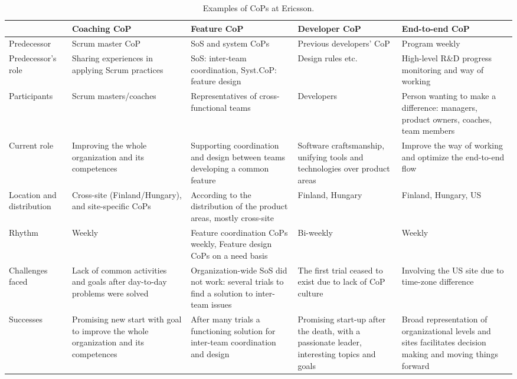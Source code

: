 \begin{landscape}
\begin{table}
\begin{center}
    \begin{tabular}{| p{3.5cm} | p{4.5cm} | p{4.5cm} | p{4.5cm} | p{4.5cm} |}
    \hline
     & \textbf{Coaching CoP} & \textbf{Feature CoP} & \textbf{Developer CoP} & \textbf{End-to-end CoP} \\ \hline
    Predecessor & Scrum master CoP & SoS and system CoPs & Previous developers' CoP & Program weekly \\ \hline
    Predecessor's role & Sharing experiences in applying Scrum practices & SoS: inter-team coordination, Syst.CoP: feature design & Design rules etc. & High-level R\&D progress monitoring and way of working \\ \hline
    Participants & Scrum masters/coaches & Representatives of cross-functional teams & Developers & Person wanting to make a difference: managers, product owners, coaches, team members \\ \hline
    Current role & Improving the whole organization and its competences & Supporting coordination and design between teams developing a common feature & Software craftsmanship, unifying tools and technologies over product areas & Improve the way of working and optimize the end-to-end flow \\ \hline
    Location and distribution & Cross-site (Finland/Hungary), and site-specific CoPs & According to the distribution of the product areas, mostly cross-site & Finland, Hungary & Finland, Hungary, US \\ \hline
    Rhythm & Weekly & Feature coordination CoPs weekly, Feature design CoPs on a need basis & Bi-weekly & Weekly \\ \hline
    Challenges faced & Lack of common activities and goals after day-to-day problems were solved & Organization-wide SoS did not work: several trials to find a solution to inter-team issues & The first trial ceased to exist due to lack of CoP culture & Involving the US site due to time-zone difference \\ \hline
    Successes & Promising new start with goal to improve the whole organization and its competences & After many trials a functioning solution for inter-team coordination and design & Promising start-up after the death, with a passionate leader, interesting topics and goals & Broad representation of organizational levels and sites facilitates decision making and moving things forward \\ \hline
    \end{tabular}
    \caption{Examples of CoPs at Ericsson.}
    \label{cop}
\end{center}
\end{table}
\end{landscape}

